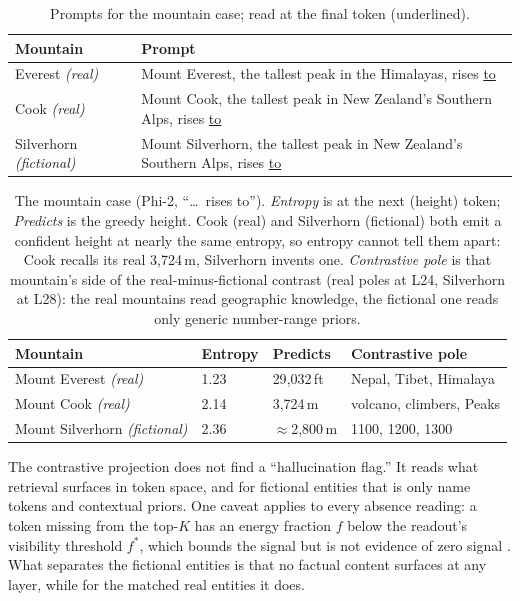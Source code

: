 \documentclass[11pt]{article}
\begin{document}
\begin{table}[htbp]
\centering
\small
\begin{tabularx}{\columnwidth}{@{}lY@{}}
\toprule
Mountain & Prompt \\
\midrule
Everest \emph{(real)}          & Mount Everest, the tallest peak in the Himalayas, rises \underline{to} \\
Cook \emph{(real)}             & Mount Cook, the tallest peak in New Zealand's Southern Alps, rises \underline{to} \\
Silverhorn \emph{(fictional)}  & Mount Silverhorn, the tallest peak in New Zealand's Southern Alps, rises \underline{to} \\
\bottomrule
\end{tabularx}
\caption{Prompts for the mountain case; read at the final token (underlined).}
\label{tab:mountain-prompts}
\end{table}

\begin{table}[htbp]
\centering
\small
\begin{tabular}{@{}llll@{}}
\toprule
Mountain & Entropy & Predicts & Contrastive pole \\
\midrule
Mount Everest \emph{(real)}       & 1.23 & 29{,}032\,ft        & Nepal, Tibet, Himalaya \\
Mount Cook \emph{(real)}          & 2.14 & 3{,}724\,m          & volcano, climbers, Peaks \\
Mount Silverhorn \emph{(fictional)} & 2.36 & $\approx$2{,}800\,m & 1100, 1200, 1300 \\
\bottomrule
\end{tabular}
\caption{The mountain case (Phi-2, ``\ldots\ rises to''). \emph{Entropy} is at
the next (height) token; \emph{Predicts} is the greedy height. Cook (real) and
Silverhorn (fictional) both emit a confident height at nearly the same entropy,
so entropy cannot tell them apart: Cook recalls its real 3{,}724\,m, Silverhorn
invents one. \emph{Contrastive pole} is that mountain's side of the real-minus-fictional
contrast (real poles at L24, Silverhorn at L28): the real mountains read
geographic knowledge, the fictional one reads only generic number-range priors.}
\label{tab:mountain}
\end{table}

The contrastive projection does not find a ``hallucination flag.'' It reads what
retrieval surfaces in token space, and for fictional entities that is only name
tokens and contextual priors. One caveat applies to every absence reading: a
token missing from the top-$K$ has an energy fraction $f$ below the readout's
visibility threshold $f^{*}$, which bounds the signal but is not evidence of zero
signal \citep{tuomi2026visibility}. What separates the fictional entities is that no
factual content surfaces at any layer, while for the matched real entities it
does.
\end{document}
